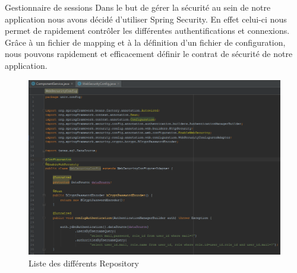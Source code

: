 \documentclass[a4paper]{article}
\makeatletter
\renewcommand{\section}{\@startsection{section}{1}{\z@}
{-4ex \@plus -1ex \@minus -.4ex}
{1ex \@plus.2ex }
{\normalfont\large\sffamily\bfseries}}
\makeatother
\begin{document}
\section{Gestionnaire de sessions}
Dans le but de gérer la sécurité au sein de notre application nous avons décidé d'utiliser Spring Security. En effet celui-ci nous permet de rapidement contrôler les différentes authentifications et connexions. Grâce à un fichier de mapping et à la définition d'un fichier de configuration, nous pouvons rapidement et efficacement définir le contrat de sécurité de notre application.

\begin{figure}[h]
\centering
\includegraphics[scale=.3]{example_secur.png}
\caption{Liste des différents Repository}
\end{figure}
\end{document}
